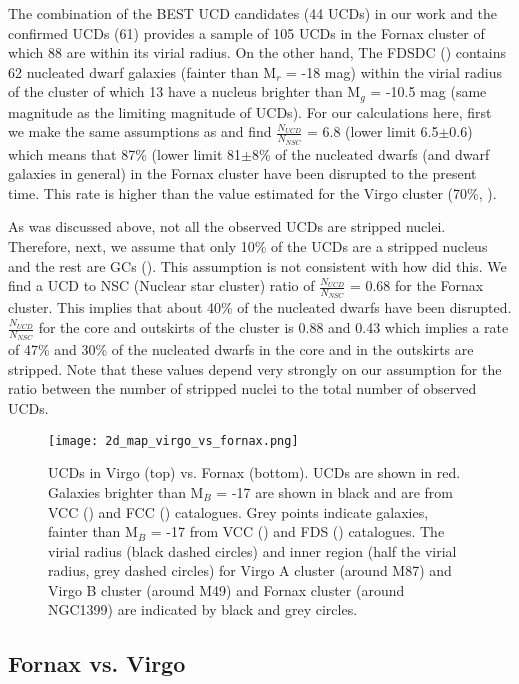 \documentclass[fleqn,usenatbib]{mnras}
\begin{document}
The combination of the BEST UCD candidates (44 UCDs) in our work and the confirmed UCDs (61) provides a sample of 105 UCDs in the Fornax cluster of which 88 are within its virial radius. On the other hand, The FDSDC (\citealp{venhola2018}) contains 62 nucleated dwarf galaxies (fainter than M$_r$ = -18 mag) within the virial radius of the cluster of which 13 have a nucleus brighter than M$_g$ = -10.5 mag (same magnitude as the limiting magnitude of UCDs). For our calculations here, first we make the same assumptions as \citet{Ferrarese} and find $\frac{N_{UCD}}{N_{NSC}}$ = 6.8 (lower limit 6.5$\pm$0.6) which means that 87\% (lower limit 81$\pm$8\% of the nucleated dwarfs (and dwarf galaxies in general) in the Fornax cluster have been disrupted to the present time. This rate is higher than the value estimated for the Virgo cluster (70\%, \citealp{Ferrarese}).

As was discussed above, not all the observed UCDs are stripped nuclei. Therefore, next, we assume that only 10\% of the UCDs are a stripped nucleus and the rest are GCs (\citealp{Pfeffer2014,Pfeffer-2016}). This assumption is not consistent with how \citet{Ferrarese} did this. We find a UCD to NSC (Nuclear star cluster) ratio of $ \frac{N_{UCD}}{N_{NSC}} $ = 0.68 for the Fornax cluster. This implies that about 40\% of the nucleated dwarfs have been disrupted. $\frac{N_{UCD}}{N_{NSC}}$ for the core and outskirts of the cluster is 0.88 and 0.43 which implies a rate of 47\% and 30\% of the nucleated dwarfs in the core and in the outskirts are stripped. Note that these values depend very strongly on our assumption for the ratio between the number of stripped nuclei to the total number of observed UCDs.

\begin{figure}
\texttt{[image: 2d\_map\_virgo\_vs\_fornax.png]}
\caption{UCDs in Virgo (top) vs. Fornax (bottom). UCDs are shown in red. Galaxies brighter than M$_B$ = -17 are shown in black and are from VCC (\citealp{vcc}) and FCC (\citealp{fcc}) catalogues. Grey points indicate galaxies, fainter than M$_B$ = -17 from VCC (\citealp{vcc}) and FDS (\citealp{venhola2018}) catalogues. The virial radius (black dashed circles) and inner region (half the virial radius, grey dashed circles) for Virgo A cluster (around M87) and Virgo B cluster (around M49) and Fornax cluster (around NGC1399) are indicated by black and grey circles.}
\label{fornaxvsvirgo}
\end{figure}

\subsection{Fornax vs. Virgo}
\end{document}
